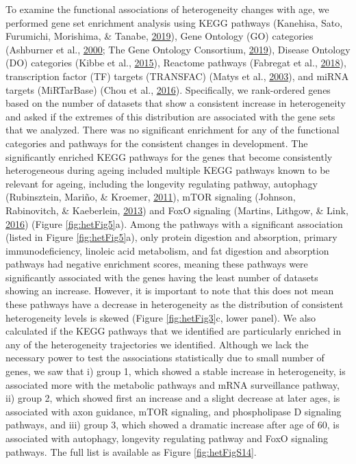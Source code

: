 \documentclass[12pt,twoside]{unicam}
\begin{document}
To examine the functional associations of heterogeneity changes with age, we performed gene set enrichment analysis using KEGG pathways (Kanehisa, Sato, Furumichi, Morishima, \& Tanabe, \protect\hyperlink{ref-Kanehisa2019}{2019}), Gene Ontology (GO) categories (Ashburner et al., \protect\hyperlink{ref-Ashburner2000}{2000}; The Gene Ontology Consortium, \protect\hyperlink{ref-TheGeneOntologyConsortium2019}{2019}), Disease Ontology (DO) categories (Kibbe et al., \protect\hyperlink{ref-Kibbe2015}{2015}), Reactome pathways (Fabregat et al., \protect\hyperlink{ref-Fabregat2018}{2018}), transcription factor (TF) targets (TRANSFAC) (Matys et al., \protect\hyperlink{ref-Matys2003}{2003}), and miRNA targets (MiRTarBase) (Chou et al., \protect\hyperlink{ref-Chou2016}{2016}). Specifically, we rank-ordered genes based on the number of datasets that show a consistent increase in heterogeneity and asked if the extremes of this distribution are associated with the gene sets that we analyzed. There was no significant enrichment for any of the functional categories and pathways for the consistent changes in development. The significantly enriched KEGG pathways for the genes that become consistently heterogeneous during ageing included multiple KEGG pathways known to be relevant for ageing, including the longevity regulating pathway, autophagy (Rubinsztein, Mariño, \& Kroemer, \protect\hyperlink{ref-Rubinsztein2011}{2011}), mTOR signaling (Johnson, Rabinovitch, \& Kaeberlein, \protect\hyperlink{ref-Johnson2013}{2013}) and FoxO signaling (Martins, Lithgow, \& Link, \protect\hyperlink{ref-Martins2016}{2016}) (Figure \ref{fig:hetFig5}a). Among the pathways with a significant association (listed in Figure \ref{fig:hetFig5}a), only protein digestion and absorption, primary immunodeficiency, linoleic acid metabolism, and fat digestion and absorption pathways had negative enrichment scores, meaning these pathways were significantly associated with the genes having the least number of datasets showing an increase. However, it is important to note that this does not mean these pathways have a decrease in heterogeneity as the distribution of consistent heterogeneity levels is skewed (Figure \ref{fig:hetFig3}c, lower panel). We also calculated if the KEGG pathways that we identified are particularly enriched in any of the heterogeneity trajectories we identified. Although we lack the necessary power to test the associations statistically due to small number of genes, we saw that i) group 1, which showed a stable increase in heterogeneity, is associated more with the metabolic pathways and mRNA surveillance pathway, ii) group 2, which showed first an increase and a slight decrease at later ages, is associated with axon guidance, mTOR signaling, and phospholipase D signaling pathways, and iii) group 3, which showed a dramatic increase after age of 60, is associated with autophagy, longevity regulating pathway and FoxO signaling pathways. The full list is available as Figure \ref{fig:hetFigS14}.
\end{document}

